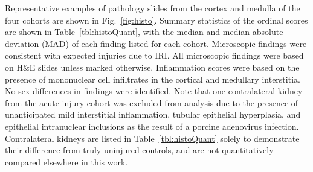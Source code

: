Representative examples of pathology slides from the cortex and medulla of the four cohorts are shown in Fig.~\ref{fig:histo}. Summary statistics of the ordinal scores are shown in Table~\ref{tbl:histoQuant}, with the median and median absolute deviation (MAD) of each finding listed for each cohort. Microscopic findings were consistent with expected injuries due to IRI. All microscopic findings were based on H\&E slides unless marked otherwise. Inflammation scores were based on the presence of mononuclear cell infiltrates in the cortical and medullary interstitia. No sex differences in findings were identified. Note that one contralateral kidney from the acute injury cohort was excluded from analysis due to the presence of unanticipated mild interstitial inflammation, tubular epithelial hyperplasia, and epithelial intranuclear inclusions as the result of a porcine adenovirus infection. Contralateral kidneys are listed in Table~\ref{tbl:histoQuant} solely to demonstrate their difference from truly-uninjured controls, and are not quantitatively compared elsewhere in this work.

